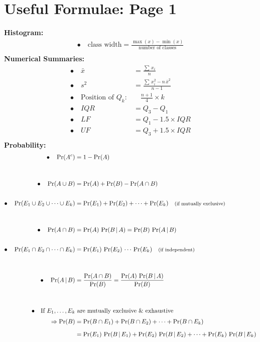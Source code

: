 \documentclass[12pt]{article}
\begin{document}
\section*{Useful Formulae: Page 1\\[0.3cm]}
{\bf Histogram:}\\[-0.8cm]
\begin{align*}
\bullet\quad \text{class width} = \frac{\max(x) - \min(x)}{\text{number of classes}}\\
\end{align*}
{\bf Numerical Summaries:}\\[-0.8cm]
\begin{align*}
\bullet\quad \bar x &= \frac{\sum\,x_i}{n}\\[0.6cm]
\bullet\quad s^2 &= \frac{\sum\,x_i^2 - n\,\bar x^2}{n-1}\\[0.6cm]
\bullet\quad \text{Position of } Q_k:& \quad \frac{n+1}{4}\times k \\[0.6cm]
\bullet\quad IQR &= Q_3 - Q_1 \\[0.6cm]
\bullet\quad LF &= Q_1 - 1.5 \times IQR \\[0.6cm]
\bullet\quad UF &= Q_3 + 1.5 \times IQR\\
\end{align*}
{\bf Probability:}\\[-0.8cm]
\begin{align*}
\bullet\quad \Pr(A^c) &= 1 - \Pr(A) \\[1cm]
\bullet\quad \Pr(A \cup B) &= \Pr(A) + \Pr(B) - \Pr(A \cap B)\\[0.6cm]
\bullet\quad \Pr(E_1 \cup E_2 \cup \cdots \cup E_k) &= \Pr(E_1) + \Pr(E_2) + \cdots + \Pr(E_k) \text{\quad{\footnotesize(if mutually exclusive)}}\\[1cm]
\bullet\quad \Pr(A \cap B) &= \Pr(A) \, \Pr(B \, | \, A) = \Pr(B) \, \Pr(A \, | \, B) \\[0.6cm]
\bullet\quad \Pr(E_1 \cap E_2 \cap \cdots \cap E_k) &= \Pr(E_1) \, \Pr(E_2) \, \cdots \, \Pr(E_k) \text{\quad{\footnotesize(if independent)}}\\[1cm]
\bullet\quad \Pr(A\,|\,B) &= \frac{\Pr(A \cap B)}{\Pr(B)} = \frac{\Pr(A) \,\Pr(B\,|\,A)}{\Pr(B)}\\[1cm]
\bullet\quad \text{If $E_1,\ldots, E_k$} & \,\, \text{are mutually exclusive \& exhaustive}\\[0.1cm]
\Rightarrow \Pr(B) &= \Pr(B \cap E_1) + \Pr(B \cap E_2) + \cdots + \Pr(B \cap E_k) \\[0.2cm]
&= \Pr(E_1) \, \Pr(B\,|\,E_1) + \Pr(E_2) \, \Pr(B\,|\,E_2) + \cdots + \Pr(E_k) \, \Pr(B\,|\,E_k)\\
\end{align*}
\end{document}
